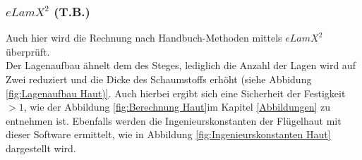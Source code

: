 \subsubsection{$eLamX^{2}$ (T.B.)}

Auch hier wird die Rechnung nach Handbuch-Methoden mittels $eLamX^{2}$ überprüft. \\

\noindent Der Lagenaufbau ähnelt dem des Steges, lediglich die Anzahl der Lagen wird auf Zwei reduziert und die Dicke des Schaumstoffs erhöht (siehe Abbidung \ref{fig:Lagenaufbau Haut)}. Auch hierbei ergibt sich eine Sicherheit der Festigkeit $>1$, wie der Abbildung \ref{fig:Berechnung Haut}im  Kapitel \ref{Abbildungen} zu entnehmen ist. Ebenfalls werden die Ingenieurskonstanten der Flügelhaut mit dieser Software ermittelt, wie in Abbildung \ref{fig:Ingenieurskonstanten Haut} dargestellt wird.